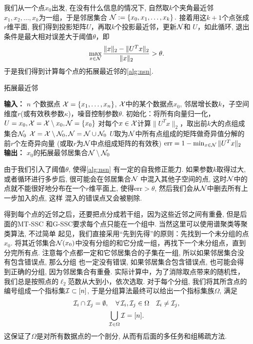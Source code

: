 我们从一个点\(x_0\)出发, 在没有什么信息的情况下, 自然取\(k\)个夹角最近邻
\(x_1, x_2, \ldots, x_k \)为一组，于是邻居集合
\(\mathcal{N} := \left\{ x_0, x_1, \ldots, x_k \right\}.\)
接着用这\(k+1\)个点张成\(r\)维平面, 我们得到投影矩阵\(U\)，再取\(k\)个投影最近邻，更新\(\mathcal{N}\)和
\(U\)，如此循环, 退出条件是最大相对误差大于阈值\(\theta\)，即
\[\max_{x\in \mathcal{N}} \frac{\|x\|_2-\|U^T x\|_2}{\|x\|_2} > \theta.\]
于是我们得到计算每个点的拓展最近邻的\autoref{alg:nsn}.
\begin{algorithm}[tb] \caption{拓展最近邻}\label{alg:nsn}
  \begin{algorithmic}
    \State \textbf{输入：} \(n\) 个数据点 \(\mathcal{X} = \{x_1,\ldots,x_n\}\),
    \(\mathcal{X}\)中的某个数据点\(x_0\), 邻居增长数\(k\)，子空间维度\(r\)(或有效秩参数\(\kappa\))，噪音控制参数\(\theta\).
    \State 初始化：将所有向量归一化，\(U = x_0, \mathcal{X} = \mathcal{X} \setminus x_0,
    \mathcal{N}=\{x_0\}\) 
    \Repeat
     对每个\(x\in \mathcal{X}\)计算\(\|U^Tx\|_2\)，取出前\(k\)大的点组成集合\(\mathcal{N}_0\)
     \(\mathcal{X} = \mathcal{X} \setminus \mathcal{N}_0, \mathcal{N} = \mathcal{N} \cup \mathcal{N}_0\)
     \(U\)取为\(\mathcal{N}\)中所有点组成的矩阵做奇异值分解的前\(r\)个左奇异向量
    (或取\(r\)为\(\mathcal{N}\)中点组成矩阵的有效秩)
     \(\text{err}=1 - \min_{x \in \mathcal{N}}\|U^T x\|_2\)
    \State \textbf{输出：} \(x_0\)的拓展最邻居集合\(\mathcal{N} \setminus \mathcal{N}_0\)
  \end{algorithmic}
\end{algorithm}

由于我们引入了阈值\(\theta\), 使得\autoref{alg:nsn} 有一定的自我修正能力.
如果参数\(k\)取得过大, 或者循环进行多步后, 很可能会在邻居集合\(\mathcal{N}\)
中混入其他子空间的点, 这时\(\mathcal{N}\)中的点就不能很好地分布在一个\(r\)维平面上,
使得\(\text{err}>\theta\), 然后我们会从\(\mathcal{N}\)中删去所有上一步加入的点, 这样
混入的错误点又会被剔除. 

得到每个点的近邻之后，还要把点分成若干组，因为这些近邻之间有重叠, 但是后面的MT-SSC
和G-SSC要求每个点只能在一个组中. 当然这里可以使用谱聚类等聚类算法, 不过简单
起见，我们直接采用``先到先得''的原则：先找到一个未分组的点\(x_0\).
将其近邻集合\(\mathcal{N}(x_0)\)中没有分组的和它分成一组，再找下一个未分组点，直到分完所有点.
注意每个点都一定和它邻居集合的子集在一组, 所以如果邻居集合没有包含错误点, 那么分组
也一定没有错误, 如果邻居集合包含错误点, 也可能会得到正确的分组,
因为邻居集合有重叠.
实际计算中，为了消除取点带来的随机性，我们总是按照点的\(\ell_2\)范数从大到小，依次选取.
对于每个分组, 我们将其所含点的编号组成一个指标集\(\mathcal{I} \subset [n]\),
于是分组算法最终可以给出一个指标集族\(\Omega\), 满足
\begin{gather}
  \mathcal{I}_i \cap \mathcal{I}_j = \emptyset,\quad \forall \,\mathcal{I}_i, \mathcal{I}_j \in \Omega\quad \mathcal{I}_i
  \neq \mathcal{I}_j, \label{eq:nointer}\\
  \bigcup_{\mathcal{I}\in \Omega} \mathcal{I} = [n].\label{eq:full} 
\end{gather}
这保证了\(\Omega\)是对所有数据点的一个剖分, 从而有后面的多任务和组稀疏方法.

